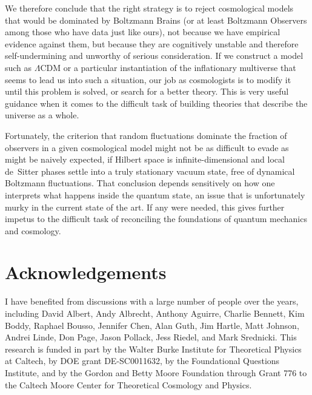 \documentclass[12pt,letterpaper]{article}
\begin{document}
We therefore conclude that the right strategy is to reject cosmological models that would be dominated by Boltzmann Brains (or at least Boltzmann Observers among those who have data just like ours), not because we have empirical evidence against them, but because they are cognitively unstable and therefore self-undermining and unworthy of serious consideration.
If we construct a model such as $\Lambda$CDM or a particular instantiation of the inflationary multiverse that seems to lead us into such a situation, our job as cosmologists is to modify it until this problem is solved, or search for a better theory.
This is very useful guidance when it comes to the difficult task of building theories that describe the universe as a whole.

Fortunately, the criterion that random fluctuations dominate the fraction of observers in a given cosmological model might not be as difficult to evade as might be naively expected, if Hilbert space is infinite-dimensional and local de~Sitter phases settle into a truly stationary vacuum state, free of dynamical Boltzmann fluctuations.
That conclusion depends sensitively on how one interprets what happens inside the quantum state, an issue that is unfortunately murky in the current state of the art.
If any were needed, this gives further impetus to the difficult task of reconciling the foundations of quantum mechanics and cosmology.


\section*{Acknowledgements}

I have benefited from discussions with a large number of people over the years, including David Albert, Andy Albrecht, Anthony Aguirre, Charlie Bennett, Kim Boddy, Raphael Bousso, Jennifer Chen, Alan Guth, Jim Hartle, Matt Johnson, Andrei Linde, Don Page, Jason Pollack, Jess Riedel, and Mark Srednicki.  
This research is funded in part by the Walter Burke Institute for Theoretical Physics at Caltech, by DOE grant DE-SC0011632, by the Foundational Questions Institute, and by the Gordon and Betty Moore Foundation through Grant 776 to the Caltech Moore Center for Theoretical Cosmology and Physics.
\end{document}
